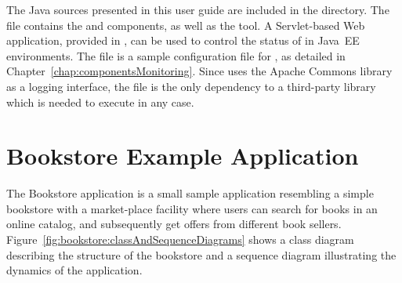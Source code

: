 The Java sources presented in this user guide are included in the %
\file{\exampleDir/} directory. %
The file \file{\mainJar{}} contains the \KiekerMonitoringPart{} and %
\KiekerAnalysisPart{} components, as well as the \KiekerTraceAnalysis{} tool. %
A Servlet-based Web application, provided in \file{\servletWar}, can be used %
to control the status of \KiekerMonitoringPart{} in Java~EE %
environments. The file \file{\kiekerMonitoringProperties{}} is a sample configuration %
file for \KiekerMonitoringPart{}, as detailed in Chapter~\ref{chap:componentsMonitoring}. %
Since \Kieker{} uses the Apache Commons library~\cite{CommonsLogging-WebSite} %
as a logging interface, the file \file{\commonsLoggingJar} is the only dependency %
to a third-party library which is needed to execute \Kieker{} in any case. 

\section{Bookstore Example Application}\label{sec:example:bookstore}

The Bookstore application is a small sample application resembling a simple %
bookstore with a market-place facility where users can search for books in an %
online catalog, and subsequently get offers from different book sellers. %
Figure~\ref{fig:bookstore:classAndSequenceDiagrams} shows %
a class diagram describing the structure of the bookstore and %
a sequence diagram illustrating the dynamics of the application. 

